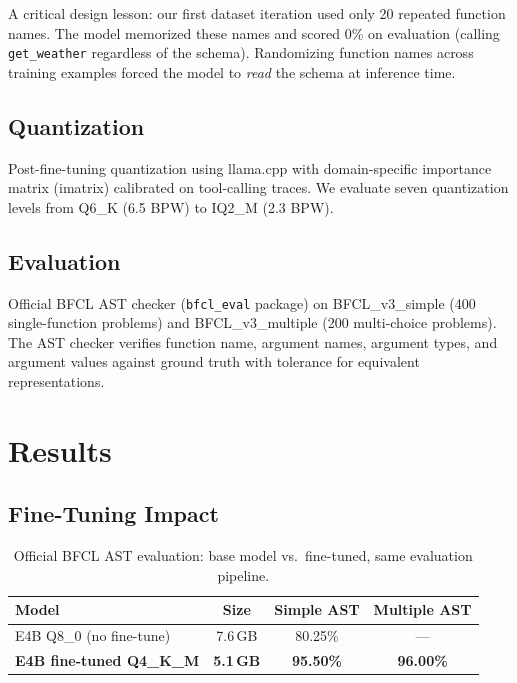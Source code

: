 \documentclass[11pt,a4paper]{article}
\begin{document}
A critical design lesson: our first dataset iteration used only 20 repeated function names. The model memorized these names and scored 0\% on evaluation (calling \texttt{get\_weather} regardless of the schema). Randomizing function names across training examples forced the model to \emph{read} the schema at inference time.

\subsection{Quantization}

Post-fine-tuning quantization using llama.cpp with domain-specific importance matrix (imatrix) calibrated on tool-calling traces. We evaluate seven quantization levels from Q6\_K (6.5 BPW) to IQ2\_M (2.3 BPW).

\subsection{Evaluation}

Official BFCL AST checker (\texttt{bfcl\_eval} package) on BFCL\_v3\_simple (400 single-function problems) and BFCL\_v3\_multiple (200 multi-choice problems). The AST checker verifies function name, argument names, argument types, and argument values against ground truth with tolerance for equivalent representations.

\section{Results}

\subsection{Fine-Tuning Impact}

\begin{table}[H]
\centering
\caption{Official BFCL AST evaluation: base model vs.\ fine-tuned, same evaluation pipeline.}
\label{tab:finetune}
\begin{tabular}{lccc}
\toprule
\textbf{Model} & \textbf{Size} & \textbf{Simple AST} & \textbf{Multiple AST} \\
\midrule
E4B Q8\_0 (no fine-tune) & 7.6\,GB & 80.25\% & --- \\
\textbf{E4B fine-tuned Q4\_K\_M} & \textbf{5.1\,GB} & \textbf{95.50\%} & \textbf{96.00\%} \\
\bottomrule
\end{tabular}
\end{table}
\end{document}
